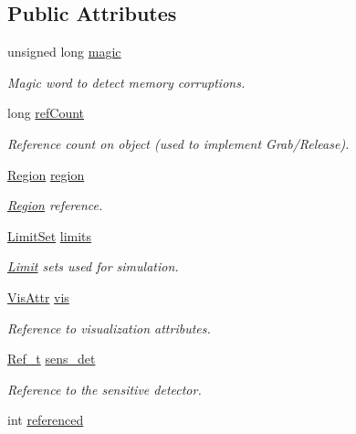 \subsection*{Public Attributes}
\begin{DoxyCompactItemize}
\item 
unsigned long \hyperlink{class_d_d4hep_1_1_geometry_1_1_volume_extension_ac2ad71bb6a554c749f06c8cce9a8fe8a}{magic}
\begin{DoxyCompactList}\small\item\em Magic word to detect memory corruptions. \item\end{DoxyCompactList}\item 
long \hyperlink{class_d_d4hep_1_1_geometry_1_1_volume_extension_a604559432eb0145b52013c5105a2566b}{refCount}
\begin{DoxyCompactList}\small\item\em Reference count on object (used to implement Grab/Release). \item\end{DoxyCompactList}\item 
\hyperlink{class_d_d4hep_1_1_geometry_1_1_region}{Region} \hyperlink{class_d_d4hep_1_1_geometry_1_1_volume_extension_ac4303caba2a748fd25e8c986c8001096}{region}
\begin{DoxyCompactList}\small\item\em \hyperlink{class_d_d4hep_1_1_geometry_1_1_region}{Region} reference. \item\end{DoxyCompactList}\item 
\hyperlink{class_d_d4hep_1_1_geometry_1_1_limit_set}{LimitSet} \hyperlink{class_d_d4hep_1_1_geometry_1_1_volume_extension_a2197ef0277ad4fdebc1a285ec311d019}{limits}
\begin{DoxyCompactList}\small\item\em \hyperlink{class_d_d4hep_1_1_geometry_1_1_limit}{Limit} sets used for simulation. \item\end{DoxyCompactList}\item 
\hyperlink{class_d_d4hep_1_1_geometry_1_1_vis_attr}{VisAttr} \hyperlink{class_d_d4hep_1_1_geometry_1_1_volume_extension_ae4a19cb963f258f84a6fa871e8b6f4c1}{vis}
\begin{DoxyCompactList}\small\item\em Reference to visualization attributes. \item\end{DoxyCompactList}\item 
\hyperlink{group___d_d4_h_e_p___g_e_o_m_e_t_r_y_ga40af83be6718bb8828a3d83dc7f8c930}{Ref\_\-t} \hyperlink{class_d_d4hep_1_1_geometry_1_1_volume_extension_a3b0ac7f31e5c962f0eb479c24d4c72ea}{sens\_\-det}
\begin{DoxyCompactList}\small\item\em Reference to the sensitive detector. \item\end{DoxyCompactList}\item 
int \hyperlink{class_d_d4hep_1_1_geometry_1_1_volume_extension_aa73b0b45a2b7112a60e9616da6edcde4}{referenced}
\end{DoxyCompactItemize}



